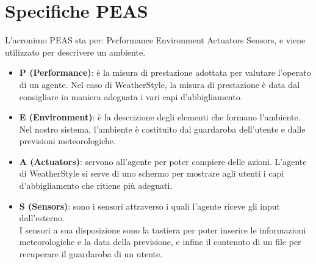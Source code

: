\documentclass[a4paper, 11pt, oneside]{report}
\begin{document}
            \section{Specifiche PEAS}
            L'acronimo PEAS sta per: Performance Environment Actuators Sensors, e viene utilizzato per descrivere un ambiente.
            \begin{itemize}
                \item \textbf{P (Performance)}: è la misura di prestazione adottata per valutare l'operato di un agente.
                Nel caso di WeatherStyle, la misura di prestazione è data dal consigliare in maniera adeguata i vari capi
                d'abbigliamento.
                \item \textbf{E (Environment)}: è la descrizione degli elementi che formano l'ambiente. Nel nostro
                sistema, l'ambiente è costituito dal guardaroba dell'utente e dalle previsioni meteorologiche.
                \item \textbf{A (Actuators)}: servono all'agente per poter compiere delle azioni. L'agente di WeatherStyle
                si serve di uno schermo per mostrare agli utenti i capi d'abbigliamento che ritiene più adeguati.
                \item \textbf{S (Sensors)}: sono i sensori attraverso i quali l'agente riceve gli input dall'esterno.
                \\ I sensori a sua disposizione sono la tastiera per poter inserire le informazioni meteorologiche e la
                data della previsione, e infine il contenuto di un file per recuperare il guardaroba di un utente.
            \end{itemize}
\end{document}
